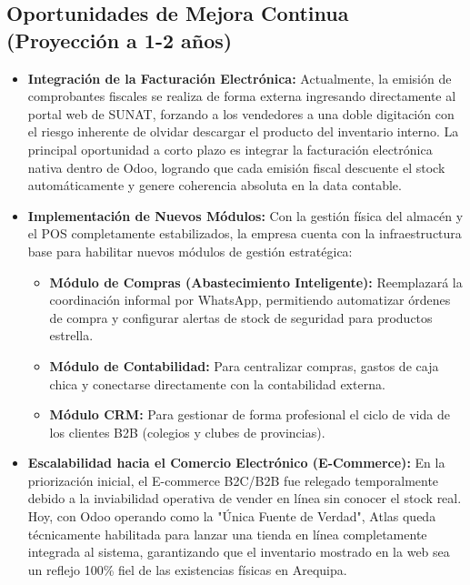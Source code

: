 \subsection{Oportunidades de Mejora Continua (Proyección a 1-2 años)}

\begin{itemize}
    \item \textbf{Integración de la Facturación Electrónica:} Actualmente, la emisión de comprobantes fiscales se realiza de forma externa ingresando directamente al portal web de SUNAT, forzando a los vendedores a una doble digitación con el riesgo inherente de olvidar descargar el producto del inventario interno. La principal oportunidad a corto plazo es integrar la facturación electrónica nativa dentro de Odoo, logrando que cada emisión fiscal descuente el stock automáticamente y genere coherencia absoluta en la data contable.
    \item \textbf{Implementación de Nuevos Módulos:} Con la gestión física del almacén y el POS completamente estabilizados, la empresa cuenta con la infraestructura base para habilitar nuevos módulos de gestión estratégica:
    \begin{itemize}
        \item \textbf{Módulo de Compras (Abastecimiento Inteligente):} Reemplazará la coordinación informal por WhatsApp, permitiendo automatizar órdenes de compra y configurar alertas de stock de seguridad para productos estrella.
        \item \textbf{Módulo de Contabilidad:} Para centralizar compras, gastos de caja chica y conectarse directamente con la contabilidad externa.
        \item \textbf{Módulo CRM:} Para gestionar de forma profesional el ciclo de vida de los clientes B2B (colegios y clubes de provincias).
    \end{itemize}
    \item \textbf{Escalabilidad hacia el Comercio Electrónico (E-Commerce):} En la priorización inicial, el E-commerce B2C/B2B fue relegado temporalmente debido a la inviabilidad operativa de vender en línea sin conocer el stock real. Hoy, con Odoo operando como la "Única Fuente de Verdad", Atlas queda técnicamente habilitada para lanzar una tienda en línea completamente integrada al sistema, garantizando que el inventario mostrado en la web sea un reflejo 100\% fiel de las existencias físicas en Arequipa.
\end{itemize}
